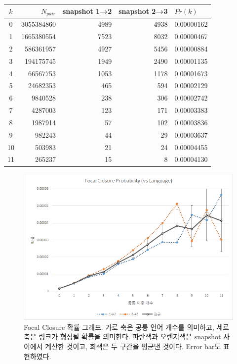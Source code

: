\documentclass[10pt, a4paper, titlepage]{article}
\begin{document}
\begin{longtable}{|c|r|r|r|l|}

\hline
\rowcolor[gray]{0.8}
$k$ & 
$N_{pair}$ & 
snapshot 1→2 &
snapshot 2→3 & 
$Pr(k)$ \\ \hline


0 &
3055384860 &
4989 &
4938 &
0.00000162 \\ \hline 
1 &
1665380554 &
7523 &
8032 &
0.00000467 \\ \hline 
2 &
586361957 &
4927 &
5456 &
0.00000884 \\ \hline 
3 &
194175745 &
1949 &
2490 &
0.00001135 \\ \hline 
4 &
66567753 &
1053 &
1178 &
0.00001673 \\ \hline 
5 &
24682353 &
465 &
594 &
0.00002129 \\ \hline 
6 &
9840528 &
238 &
306 &
0.00002742 \\ \hline 
7 &
4287003 &
123 &
171 &
0.00003383 \\ \hline 
8 &
1987914 &
57 &
102 &
0.00003836 \\ \hline 
9 &
982243 &
44 &
29 &
0.00003637 \\ \hline 
10 &
503983 &
21 &
24 &
0.00004455 \\ \hline 
11 &
265237 &
15 &
8 &
0.00004130 \\ \hline 

\end{longtable}

\begin{figure}
\includegraphics[width=\textwidth]{image16}
\caption{Focal Closure 확률 그래프. 가로 축은 공통 언어 개수를 의미하고, 세로 축은 링크가 형성될 확률을 의미한다. 파란색과 오렌지색은 snapshot 사이에서 계산한 것이고, 회색은 두 구간을 평균낸 것이다. Error bar도 표현하였다.}
\label{fig:focallang}
\end{figure}
\end{document}
